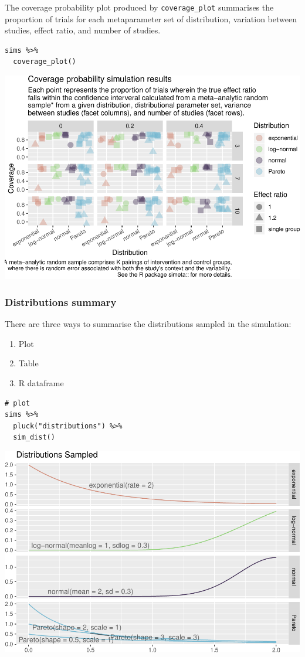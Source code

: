 \documentclass[
]{article}
\providecommand{\tightlist}{%
  \setlength{\itemsep}{0pt}\setlength{\parskip}{0pt}}
\begin{document}
The coverage probability plot produced by \texttt{coverage\_plot}
summarises the proportion of trials for each metaparameter set of
distribution, variation between studies, effect ratio, and number of
studies.

\begin{verbatim}
sims %>% 
  coverage_plot()
\end{verbatim}

\includegraphics{simeta-demo_files/figure-latex/unnamed-chunk-2-1.pdf}

\hypertarget{distributions-summary}{%
\subsubsection{Distributions summary}\label{distributions-summary}}

There are three ways to summarise the distributions sampled in the
simulation:

\begin{enumerate}
\def\labelenumi{\arabic{enumi}.}
\tightlist
\item
  Plot
\item
  Table
\item
  R dataframe
\end{enumerate}

\begin{verbatim}
# plot
sims %>% 
  pluck("distributions") %>% 
  sim_dist()
\end{verbatim}

\includegraphics{simeta-demo_files/figure-latex/unnamed-chunk-3-1.pdf}
\end{document}
